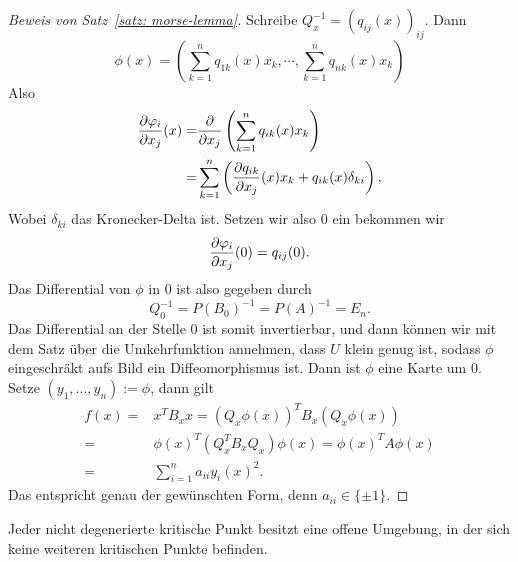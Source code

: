 \begin{proof}[Beweis von Satz~\ref{satz: morse-lemma}]
    Schreibe $Q_x^{-1} = (q_{ij}(x))_{ij}$. Dann
    \[ \phi(x) = \left( 
        \sum_{k = 1}^n q_{1k}(x) x_k, \cdots , \sum_{k = 1}^n q_{nk}(x) x_k
        \right)
    \]
    Also 
    \begin{align*}
        \pderive[\phi_i]{x_j} (x) 
            = & \pderive{x_j} \left( \sum_{k = 1}^n q_{ik} (x) x_k \right) \\
        = & \sum_{k = 1}^n \left( 
            \pderive[q_{ik}]{x_j}(x) x_k + q_{ik}(x) \delta_{ki}
        \right)
    , \end{align*}
    Wobei $\delta_{ki}$ das Kronecker-Delta ist. Setzen wir also $0$ ein
    bekommen wir
    \[ \pderive[\phi_i]{x_j}(0) = q_{ij}(0). \]
    Das Differential von $\phi$ in $0$ ist also gegeben durch
    \[ Q_0^{-1} = P(B_0)^{-1} = P(A)^{-1} = E_n . \]
    Das Differential an der Stelle $0$ ist somit invertierbar, und dann können wir mit dem 
    Satz über die Umkehrfunktion annehmen, dass $U$ klein genug ist, sodass $\phi$ 
    eingeschräkt aufs Bild ein Diffeomorphismus ist. 
    Dann ist $\phi$ eine Karte um $0$. Setze $(y_1, ..., y_n) := \phi$, dann gilt 
    \begin{align*}
        f(x) = & x^T B_x x 
            = (Q_x \phi(x))^T B_x (Q_x \phi(x)) \\
        = & \phi(x)^T (Q_x^T B_x Q_x) \phi(x) 
            = \phi(x)^T A \phi(x) \\
        = & \sum_{i = 1}^n a_{ii} y_i(x)^2
    . \end{align*}
    Das entspricht genau der gewünschten Form, denn $a_{ii} \in \{ \pm 1 \}$.
\end{proof}

\begin{corollary}
    Jeder nicht degenerierte kritische Punkt besitzt eine offene Umgebung, in der sich keine weiteren
    kritischen Punkte befinden.
\end{corollary}
